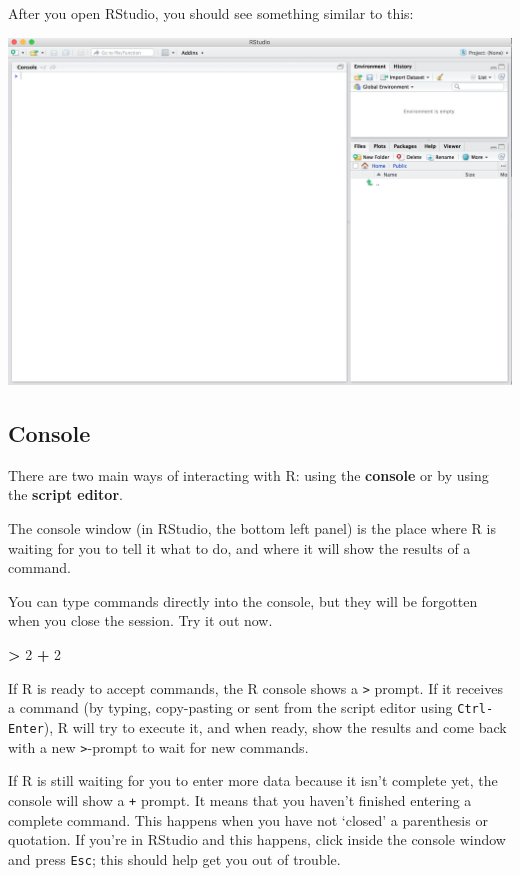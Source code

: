 \documentclass[]{book}
\newenvironment{Shaded}{\begin{snugshade}}{\end{snugshade}}
\newcommand{\DecValTok}[1]{\textcolor[rgb]{0.00,0.00,0.81}{#1}}
\newcommand{\OperatorTok}[1]{\textcolor[rgb]{0.81,0.36,0.00}{\textbf{#1}}}
\newcommand{\StringTok}[1]{\textcolor[rgb]{0.31,0.60,0.02}{#1}}
\begin{document}
After you open RStudio, you should see something similar to this:

\begin{center}\includegraphics[width=0.7\linewidth]{img/rstudio} \end{center}

\hypertarget{console}{%
\subsection{Console}\label{console}}

There are two main ways of interacting with R: using the \textbf{console} or by using the \textbf{script editor}.

The console window (in RStudio, the bottom left panel) is the place where R is waiting for you to tell it what to do, and where it will show the results of a command.

You can type commands directly into the console, but they will be forgotten when you close the session. Try it out now.

\begin{Shaded}
\begin{Highlighting}[]
\OperatorTok{>}\StringTok{ }\DecValTok{2} \OperatorTok{+}\StringTok{ }\DecValTok{2}
\end{Highlighting}
\end{Shaded}

If R is ready to accept commands, the R console shows a \texttt{\textgreater{}} prompt. If it receives a command (by typing, copy-pasting or sent from the script editor using \texttt{Ctrl-Enter}), R will try to execute it, and when ready, show the results and come back with a new \texttt{\textgreater{}}-prompt to wait for new commands.

If R is still waiting for you to enter more data because it isn't complete yet, the console will show a \texttt{+} prompt. It means that you haven't finished entering a complete command. This happens when you have not `closed' a parenthesis or quotation. If you're in RStudio and this happens, click inside the console window and press \texttt{Esc}; this should help get you out of trouble.
\end{document}
